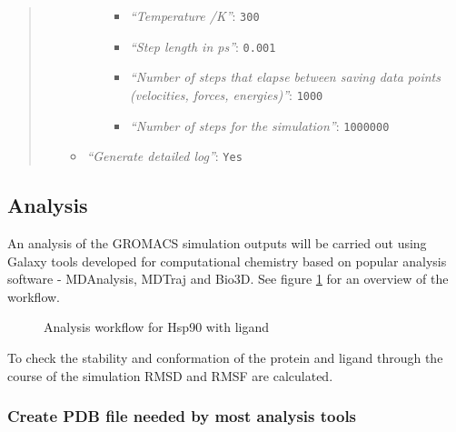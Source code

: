 \documentclass[twocolumn]{bmcart}%
\providecommand{\tightlist}{%
  \setlength{\itemsep}{0pt}\setlength{\parskip}{0pt}}
\providecommand{\tightlist}{%
  \setlength{\itemsep}{0pt}\setlength{\parskip}{0pt}}
\begin{document}
\begin{quote}
\begin{enumerate}
\begin{itemize}
\begin{itemize}
      \begin{itemize}
      \tightlist
      \item
        \emph{``Temperature /K''}: \texttt{300}
      \item
        \emph{``Step length in ps''}: \texttt{0.001}
      \item
        \emph{``Number of steps that elapse between saving data points
        (velocities, forces, energies)''}: \texttt{1000}
      \item
        \emph{``Number of steps for the simulation''}: \texttt{1000000}
      \end{itemize}
    \end{itemize}
  \item
    \emph{``Generate detailed log''}: \texttt{Yes}
  \end{itemize}
\end{enumerate}

\end{quote}

\hypertarget{analysis}{%
\subsection*{Analysis}\label{analysis}}

An analysis of the GROMACS simulation outputs will be carried out using Galaxy tools developed for computational chemistry\cite{senapathi_biomolecular_2019} based on popular analysis software - MDAnalysis\cite{michaudagrawal_mdanalysis_2011}, MDTraj\cite{mcgibbon_mdtraj_2015} and Bio3D\cite{skjaerven_integrating_2014}. See figure \ref{fig:analysisworkflow} for an overview of the workflow.

\begin{figure}[h!]
\caption{
    Analysis workflow for Hsp90 with ligand}
\centering
\label{fig:analysisworkflow}
\end{figure}

To check the stability and conformation of the protein and ligand through the course of the simulation RMSD and RMSF are calculated.




\hypertarget{create-pdb-file-needed-by-most-analysis-tools}{%
\subsubsection{Create PDB file needed by most analysis
tools}\label{create-pdb-file-needed-by-most-analysis-tools}}
\end{document}
